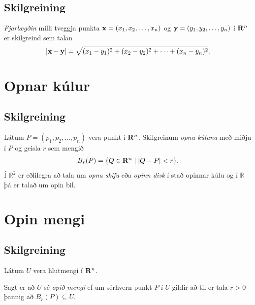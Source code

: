 \documentclass[a4paper,10pt,icelandic]{sphinxmanual}
\begin{document}
\subsection{Skilgreining}
\label{Kafli2:id2}\label{Kafli2:index-2}
\emph{Fjarlægðin} milli tveggja punkta
\(\mbox{${\bf x}$}=(x_1,x_2, \ldots,x_n)\) og
\(\mbox{${\bf y}$}=(y_1,y_2, \ldots,y_n)\) í
\(\mbox{${\bf R}^n$}\) er skilgreind sem talan
\begin{gather}
\begin{split}\displaystyle |\mbox{${\bf x}$}-\mbox{${\bf y}$}|=\sqrt{(x_1-y_1)^2+(x_2-y_2)^2+\cdots+(x_n-y_n)^2}.\end{split}\notag
\end{gather}

\section{Opnar kúlur}
\label{Kafli2:opnar-kulur}

\subsection{Skilgreining}
\label{Kafli2:index-3}\label{Kafli2:id3}
Látum \(P=(p_1,p_2,\ldots,p_n)\) vera punkt í
\(\mbox{${\bf R}^n$}\). Skilgreinum \emph{opnu kúluna} með miðju í
\(P\) og geisla \(r\) sem mengið
\begin{gather}
\begin{split}\displaystyle B_r(P)=\{Q\in\mbox{${\bf R}^n$}\mid |Q-P|<r\}.\end{split}\notag
\end{gather}
Í \({\mathbb  R}^2\) er eðlilegra að tala um \emph{opna skífu} eða \emph{opinn
disk} í stað opinnar kúlu og í \({\mathbb  R}\) þá er talað um opin
bil.


\section{Opin mengi}
\label{Kafli2:opin-mengi}

\subsection{Skilgreining}
\label{Kafli2:index-4}\label{Kafli2:id4}
Látum \(U\) vera hlutmengi í \(\mbox{${\bf R}^n$}\).

Sagt er að \(U\) sé \textit{opið mengi} ef um sérhvern punkt \(P\) í
\(U\) gildir að til er tala \(r>0\) þannig að
\(B_r(P)\subseteq U\).
\end{document}
